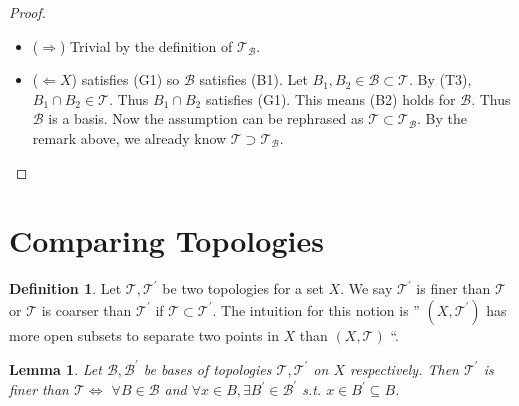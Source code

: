 \documentclass[
]{book}
\newtheorem{lemma}{Lemma}[chapter]
\theoremstyle{definition}
\newtheorem{definition}{Definition}[chapter]
\theoremstyle{definition}
\theoremstyle{definition}
\theoremstyle{definition}
\theoremstyle{remark}
\begin{document}
\begin{proof}
\leavevmode

\begin{itemize}
\item
  (\(\Rightarrow\)) Trivial by the definition of \(\mathcal{T}_{\mathcal{B}}\).
\item
  (\(\Leftarrow X\)) satisfies (G1) so \(\mathcal{B}\) satisfies (B1). Let \(B_{1}, B_{2} \in \mathcal{B} \subset \mathcal{T}\). By (T3), \(B_{1} \cap B_{2} \in \mathcal{T}\). Thus \(B_{1} \cap B_{2}\) satisfies (G1). This means (B2) holds for \(\mathcal{B}\). Thus \(\mathcal{B}\) is a basis. Now the assumption can be rephrased as \(\mathcal{T} \subset \mathcal{T}_{\mathcal{B}}\). By the remark above, we already know \(\mathcal{T} \supset \mathcal{T}_{\mathcal{B}}\).
\end{itemize}

\end{proof}

\hypertarget{comparing-topologies}{%
\section{Comparing Topologies}\label{comparing-topologies}}

\begin{definition}
\protect\hypertarget{def:unnamed-chunk-16}{}\label{def:unnamed-chunk-16}Let \(\mathcal{T}, \mathcal{T}^{\prime}\) be two topologies for a set \(X\). We say \(\mathcal{T}^{\prime}\) is finer than \(\mathcal{T}\) or \(\mathcal{T}\) is coarser than \(\mathcal{T}^{\prime}\) if \(\mathcal{T} \subset \mathcal{T}^{\prime}\). The intuition for this notion is '' \(\left(X, \mathcal{T}^{\prime}\right)\) has more open subsets to separate two points in \(X\) than \((X, \mathcal{T})\) ``.
\end{definition}

\begin{lemma}
\protect\hypertarget{lem:finerLemma}{}\label{lem:finerLemma}Let \(\mathcal{B}, \mathcal{B}^{\prime}\) be bases of topologies \(\mathcal{T}, \mathcal{T}^{\prime}\) on \(X\) respectively. Then \(\mathcal{T}^{\prime}\) is finer than \(\mathcal{T} \Leftrightarrow\) \(\forall B \in \mathcal{B}\) and \(\forall x \in B, \exists B^{\prime} \in \mathcal{B}^{\prime}\) s.t. \(x \in B^{\prime} \subseteq B\).
\end{lemma}
\end{document}
